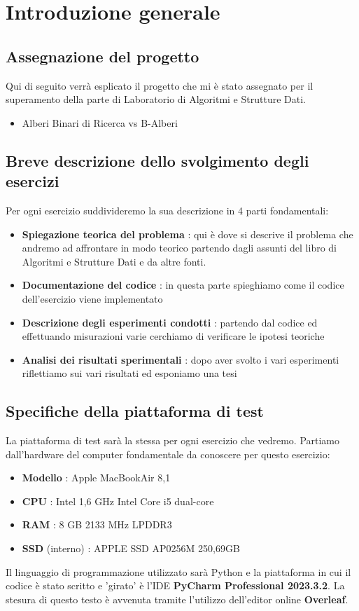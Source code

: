 \section{Introduzione generale}

\subsection{Assegnazione del progetto}
Qui di seguito verrà esplicato il progetto che mi è stato assegnato per il superamento della parte di Laboratorio di Algoritmi e Strutture Dati.

\begin{itemize}
    \item Alberi Binari di Ricerca vs B-Alberi
\end{itemize}

\subsection{Breve descrizione dello svolgimento degli esercizi}
Per ogni esercizio suddivideremo la sua descrizione in 4 parti fondamentali:

\begin{itemize}
    \item \textbf{Spiegazione teorica del problema} : qui è dove si descrive il problema che andremo ad affrontare in modo teorico partendo dagli assunti del libro di Algoritmi e Strutture Dati e da altre fonti.
    \item \textbf{Documentazione del codice} : in questa parte spieghiamo come il codice dell'esercizio viene implementato
    \item \textbf{Descrizione degli esperimenti condotti} : partendo dal codice ed effettuando misurazioni varie cerchiamo di verificare le ipotesi teoriche
    \item \textbf{Analisi dei risultati sperimentali} : dopo aver svolto i vari esperimenti riflettiamo sui vari risultati ed esponiamo una tesi
\end{itemize}

\subsection{Specifiche della piattaforma di test}
La piattaforma di test sarà la stessa per ogni esercizio che vedremo. Partiamo dall'hardware del computer fondamentale da conoscere per questo esercizio:

\begin{itemize}
    \item \textbf{Modello} : Apple MacBookAir 8,1
    \item \textbf{CPU} : Intel 1,6 GHz Intel Core i5 dual-core
    \item \textbf{RAM} : 8 GB 2133 MHz LPDDR3
    \item \textbf{SSD} (interno) : APPLE SSD AP0256M 250,69GB
\end{itemize}

Il linguaggio di programmazione utilizzato sarà Python e la piattaforma in cui il codice è stato scritto e 'girato' è l'IDE \textbf{PyCharm Professional 2023.3.2}. La stesura di questo testo è avvenuta tramite l'utilizzo dell'editor online \textbf{Overleaf}.
